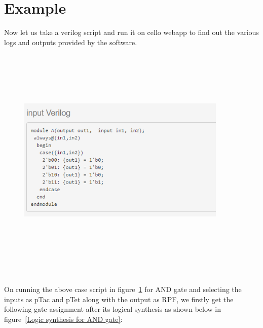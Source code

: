 \documentclass[11pt]{article}
\begin{document}
\section*{Example}
Now let us take a verilog script and run it on cello webapp to find out the various logs and outputs provided by the software.\cite{Cellocad}
\begin{figure}[ht!]
\centering
\includegraphics[width=10cm,height=11cm,keepaspectratio]{ex_input.png}
\label{Sample case input for AND gate}
\end{figure}
\\[\baselineskip]    
On running the above case script in figure~\ref{Sample case input for AND gate} for AND gate and selecting the inputs as pTac and pTet along with the output as RPF, we firstly get the following gate assignment after its logical synthesis as shown below in figure~\ref{Logic synthesis for AND gate}:  
\end{document}
